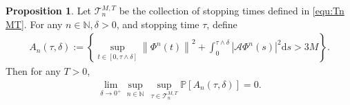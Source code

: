 \documentclass[11pt, reqno]{amsart}
\theoremstyle{definition}
\newtheorem{proposition}[theorem]{Proposition}
\numberwithin{equation}{section}
\newcommand{\bb}{\mathbb}
\newcommand{\ds}{\mathrm{d}s}
\newcommand{\norm}[1]{\left\|{#1}\right\|}
\newcommand{\abs}[1]{\left|{#1}\right|}
\begin{document}
\begin{proposition}
Let $\mathcal{T}_n^{M,T}$ be the collection of stopping times defined in \eqref{equ:Tn MT}.
For any $n\in\bb{N}, \delta>0$, and stopping time $\tau$, define
\begin{align}\label{equ:event An tau}
	A_n(\tau,\delta):= \left\{ \sup_{t\in [0,\tau\wedge \delta]} \norm{\Phi^n(t)}^2 + \int_0^{\tau\wedge \delta} \abs{\mathcal{A}\Phi^n(s)}^2 \ds > 3M \right\}.
\end{align}
Then for any $T>0$,
\begin{align}\label{equ:lim sup prob}
	\lim_{\delta \to 0^+} \sup_{n\in\bb{N}}\, \sup_{\tau \in\mathcal{T}_n^{M,T}} \bb{P}\left[ A_n(\tau,\delta) \right] =0.
\end{align}
\end{proposition}
\end{document}
